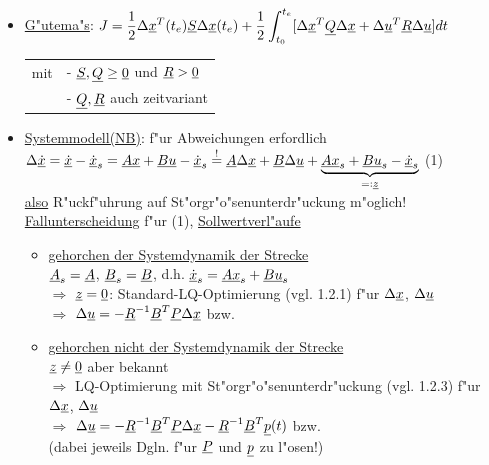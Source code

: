 \documentclass[openany,a4paper,11pt]{book}
\begin{document}
\begin{itemize}
    \item \uline{G"utema"s}: \quad
    $\displaystyle J=\frac{1}{2}\Delta\uline{x}^T(t_e)\uline{S}\Delta\uline{x}(t_e)+\frac{1}{2}\int^{t_e}_{t_0}[\Delta\uline{x}^T\uline{Q}\Delta\uline{x}+\Delta\uline{u}^T\uline{R}\Delta\uline{u}]dt$ \\
    \begin{tabular}{ll}
        mit& - $\uline{S}, \uline{Q}\geq\uline{0}$ und $\uline{R}>\uline{0}$\\
        & - $\uline{Q}, \uline{R}$ auch zeitvariant
    \end{tabular}
    \item \uline{Systemmodell(NB)}: \quad f"ur Abweichungen erfordlich $\Delta\uline{\dot{x}}=\uline{\dot{x}}-\uline{\dot{x}}_s=\uline{Ax}+\uline{Bu}-\uline{\dot{x}}_s\stackrel{!}{=}\uline{A}\Delta\uline{x}+\uline{B}\Delta\uline{u}+\underbrace{\uline{Ax}_s+\uline{Bu}_s-\uline{\dot{x}}_s}_{=:\uline{z}}$ \quad (1)\\
    \uline{also} R"uckf"uhrung auf St"orgr"o"senunterdr"uckung m"oglich!\\
    \uline{Fallunterscheidung} f"ur (1), \uline{Sollwertverl"aufe} 
    \begin{itemize}
        \item \uline{gehorchen der Systemdynamik der Strecke}\\
        $\uline{A}_s=\uline{A}$, $\uline{B}_s=\uline{B}$, d.h. $\uline{\dot{x}}_s=\uline{Ax}_s+\uline{Bu}_s$\\
        $\Rightarrow$ $\uline{z}=\uline{0}$: Standard-LQ-Optimierung (vgl. 1.2.1) f"ur $\Delta\uline{x}$, $\Delta\uline{u}$\\
        $\Rightarrow$ $\Delta\uline{u}=-\uline{R}^{-1}\uline{B}^T\uline{P}\Delta\uline{x}$ bzw. 
        \item \uline{gehorchen nicht der Systemdynamik der Strecke}\\
        $\uline{z}\neq\uline{0}$ aber bekannt\\
        $\Rightarrow$ LQ-Optimierung mit St"orgr"o"senunterdr"uckung (vgl. 1.2.3) f"ur $\Delta\uline{x}$, $\Delta\uline{u}$\\
        $\Rightarrow$ $\Delta\uline{u}=-\uline{R}^{-1}\uline{B}^T\uline{P}\Delta\uline{x}-\uline{R}^{-1}\uline{B}^T\uline{p}(t)$ \quad bzw. \\
        (dabei jeweils Dgln. f"ur $\uline{P}$ und $\uline{p}$ zu l"osen!)
    \end{itemize}
\end{itemize}
\end{document}
